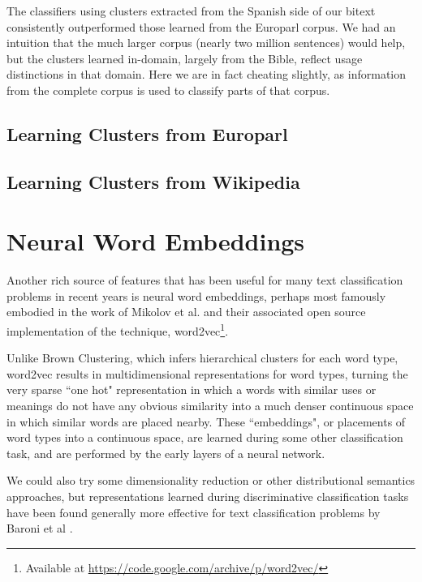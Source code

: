The classifiers using clusters extracted from the Spanish side of our bitext
consistently outperformed those learned from the Europarl corpus. We had an
intuition that the much larger corpus (nearly two million sentences) would
help, but the clusters learned in-domain, largely from the Bible, reflect
usage distinctions in that domain. Here we are in fact cheating slightly, as
information from the complete corpus is used to classify parts of that corpus.


\subsection{Learning Clusters from Europarl}

\subsection{Learning Clusters from Wikipedia}


\section{Neural Word Embeddings}






Another rich source of features that has been useful for many text
classification problems in recent years is neural word embeddings, perhaps most
famously embodied in the work of Mikolov et al. \cite{mikolovword2vec} and
their associated open source implementation of the technique,
word2vec\footnote{Available at
\url{https://code.google.com/archive/p/word2vec/}}.

Unlike Brown Clustering, which infers hierarchical clusters for each word type,
word2vec results in multidimensional representations for word types, turning
the very sparse ``one hot" representation in which a words with similar uses or
meanings do not have any obvious similarity into a much denser continuous space
in which similar words are placed nearby. These ``embeddings", or placements of
word types into a continuous space, are learned during some other
classification task, and are performed by the early layers of a neural network.

We could also try some dimensionality reduction or other distributional
semantics approaches, but representations learned during discriminative
classification tasks have been found generally more effective for text
classification problems by Baroni et al \cite{baroni2014don}.


